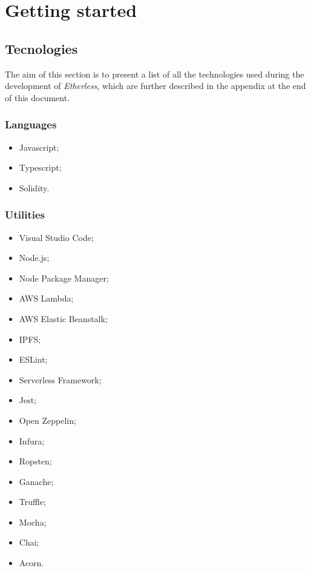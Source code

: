 \section{Getting started}
\subsection{Tecnologies}
The aim of this section is to present a list of all the technologies used during the development of \textit{Etherless}, which are further described in the appendix at the end of this document.
\subsubsection{Languages}
\begin{itemize}
	\item Javascript;
	\item Typescript;
	\item Solidity.
\end{itemize}
\subsubsection{Utilities}
\begin{itemize}
	\item Visual Studio Code;
	\item Node.js;
	\item Node Package Manager;
	\item AWS Lambda;
	\item AWS Elastic Beanstalk;
	\item IPFS;
	\item ESLint;
	\item Serverless Framework;
	\item Jest;
	\item Open Zeppelin;
	\item Infura;
	\item Ropsten;
	\item Ganache;
	\item Truffle;
	\item Mocha;
	\item Chai;
	\item Acorn.
\end{itemize}
\pagebreak
